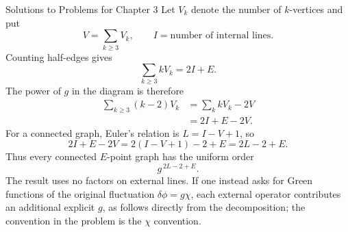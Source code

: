 \begin{bankssolutions}{Solutions to Problems for Chapter 3}
Let $V_k$ denote the number of $k$-vertices and put
\begin{equation*}
 V=\sum_{k\ge3}V_k,
 \qquad I=\text{number of internal lines}.
\end{equation*}
Counting half-edges gives
\begin{equation*}
 \sum_{k\ge3}kV_k=2I+E.
\end{equation*}
The power of $g$ in the diagram is therefore
\begin{align*}
 \sum_{k\ge3}(k-2)V_k
 &=\sum_k kV_k-2V\\
 &=2I+E-2V.
\end{align*}
For a connected graph, Euler's relation is $L=I-V+1$, so
\begin{equation*}
 2I+E-2V=2(I-V+1)-2+E=2L-2+E.
\end{equation*}
Thus every connected $E$-point graph has the uniform order
\begin{equation*}
 \boxed{g^{\,2L-2+E}}.
\end{equation*}
The result uses no factors on external lines.  If one instead asks for Green
functions of the original fluctuation $\delta\phi=g\chi$, each external
operator contributes an additional explicit $g$, as follows directly from the
decomposition; the convention in the problem is the $\chi$ convention.

\end{bankssolutions}
